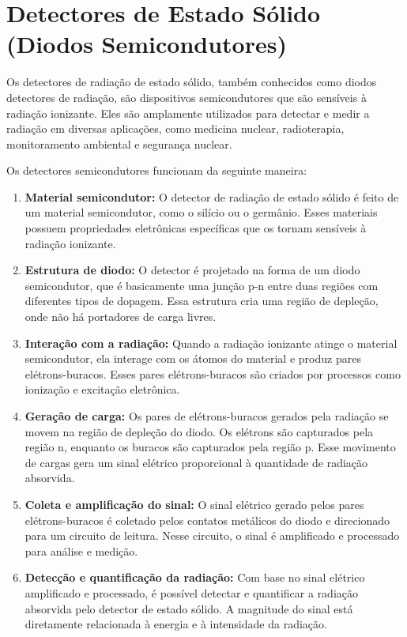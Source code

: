 \documentclass[11pt,a4paper]{article}
\begin{document}
	\section{Detectores de Estado Sólido (Diodos Semicondutores)}

	Os detectores de radiação de estado sólido, também conhecidos como diodos detectores de radiação, são dispositivos semicondutores que são sensíveis à radiação ionizante. Eles são amplamente utilizados para detectar e medir a radiação em diversas aplicações, como medicina nuclear, radioterapia, monitoramento ambiental e segurança nuclear.

	Os detectores semicondutores funcionam da seguinte maneira:

		\begin{enumerate}
			\item \textbf{Material semicondutor:} O detector de radiação de estado sólido é feito de um material semicondutor, como o silício ou o germânio. Esses materiais possuem propriedades eletrônicas específicas que os tornam sensíveis à radiação ionizante.
			\item \textbf{Estrutura de diodo:} O detector é projetado na forma de um diodo semicondutor, que é basicamente uma junção p-n entre duas regiões com diferentes tipos de dopagem. Essa estrutura cria uma região de depleção, onde não há portadores de carga livres.
			\item \textbf{Interação com a radiação:} Quando a radiação ionizante atinge o material semicondutor, ela interage com os átomos do material e produz pares elétrons-buracos. Esses pares elétrons-buracos são criados por processos como ionização e excitação eletrônica.
			\item \textbf{Geração de carga:} Os pares de elétrons-buracos gerados pela radiação se movem na região de depleção do diodo. Os elétrons são capturados pela região n, enquanto os buracos são capturados pela região p. Esse movimento de cargas gera um sinal elétrico proporcional à quantidade de radiação absorvida.
			\item \textbf{Coleta e amplificação do sinal:} O sinal elétrico gerado pelos pares elétrons-buracos é coletado pelos contatos metálicos do diodo e direcionado para um circuito de leitura. Nesse circuito, o sinal é amplificado e processado para análise e medição.
			\item \textbf{Detecção e quantificação da radiação:} Com base no sinal elétrico amplificado e processado, é possível detectar e quantificar a radiação absorvida pelo detector de estado sólido. A magnitude do sinal está diretamente relacionada à energia e à intensidade da radiação.
		\end{enumerate}
		
\end{document}
